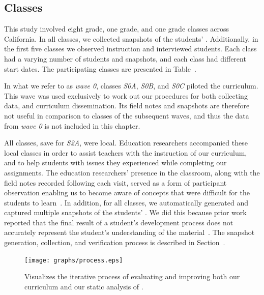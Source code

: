 \subsection{Classes} 
This study involved eight  grade, one  grade, and one 
grade classes across California. In all classes, we collected snapshots of the
students' . Additionally, in the first five classes we observed
instruction and interviewed students. Each class had a varying number of
students and snapshots, and each class had different start dates. The
participating classes are presented in Table~.

In what we refer to as \emph{wave 0}, classes \emph{S0A}, \emph{S0B}, and
\emph{S0C} piloted the curriculum. This wave was used exclusively to work out
our procedures for both collecting data, and curriculum dissemination. Its
field notes and snapshots are therefore not useful in comparison to classes of
the subsequent waves, and thus the data from \emph{wave 0} is not included in
this chapter.

All classes, save for \emph{S2A}, were local. Education researchers accompanied
these local classes in order to assist teachers with the instruction of our
curriculum, and to help students with issues they experienced while completing
our assignments. The education researchers' presence in the classroom, along
with the field notes recorded following each visit, served as a form of
participant observation enabling us to become aware of concepts that were
difficult for the students to learn~\cite{spradley80}. In addition, for all
classes, we automatically generated and captured multiple snapshots of the
students' . We did this because prior work reported that the final
result of a student's development process does not accurately represent the
student's understanding of the
material~\cite{Piech:2012:MSL:2157136.2157182,brennan12}. The snapshot
generation, collection, and verification process is described in
Section~.

\begin{figure}[!t]
\centering
\texttt{[image: graphs/process.eps]}
\caption{Visualizes the iterative process of evaluating and improving both our
  curriculum and our static analysis of .}
\end{figure}

